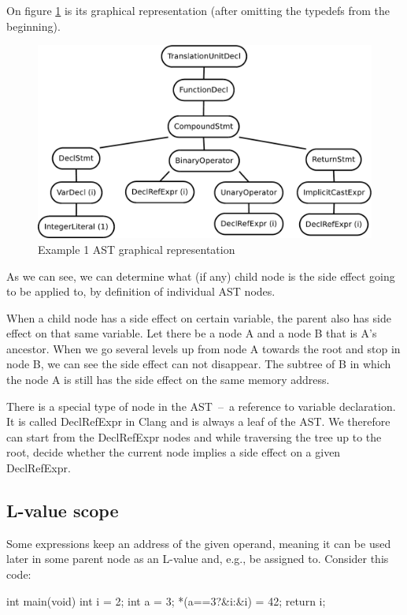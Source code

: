On figure \ref{ASTuntagged} is its graphical representation (after omitting the typedefs from the beginning).
\begin{figure}
    \caption{Example 1 AST graphical representation}
    \label{ASTuntagged}
    \centering
        \includegraphics[width=1\textwidth]{fig/example1G.pdf}
\end{figure}

As we can see, we can determine what (if any) child node is the side effect going to be applied to, by definition of individual AST nodes. 

When a child node has a side effect on certain variable, the parent also has side effect on that same variable. Let there be a node A and a node B that is A's ancestor. When we go several levels up from node A towards the root and stop in node B, we can see the side effect can not disappear. The subtree of B in which the node A is still has the side effect on the same memory address.

There is a special type of node in the AST~--~a reference to variable declaration. It is called DeclRefExpr in Clang and is always a leaf of the AST. We therefore can start from the DeclRefExpr nodes and while traversing the tree up to the root, decide whether the current node implies a side effect on a given DeclRefExpr.

\subsection{L-value scope}
Some expressions keep an address of the given operand, meaning it can be used later in some parent node as an L-value and, e.g., be assigned to. Consider this code:
\\\begin{code}
int main(void){
    int i = 2;
    int a = 3;
    *(a==3?&i:&i) = 42;
    return i;
}

\end{code}

